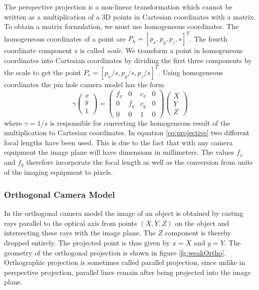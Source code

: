 \documentclass[11pt,a4paper]{report}
\begin{document}
The perspective projection is a non-linear transformation which cannot be written
as a multiplication of a 3D points in Cartesian coordinates with a matrix. To obtain a matrix formulation, we must
use homogeneous coordinates. The homogeneous coordinates of a point are $P_h =
[p_x,p_y,p_z,s]^T$. The fourth coordinate component $s$ is called
\textit{scale}. We transform a point in homogeneous coordinates into Cartesian
coordinates by dividing the first three components by the scale to get the point
$P_c = [p_x/s, p_y/s, p_z/s]^T$. Using homogeneous coordinates the pin hole
camera model has the form
\begin{equation}\label{eq:projective}
\gamma\begin{pmatrix}x\\y\\1\end{pmatrix}
= \begin{pmatrix}f_x&0&c_x&0\\0&f_y&c_y&0\\0&0&1&0\end{pmatrix} \begin{pmatrix}X\\Y\\Z\end{pmatrix}
\end{equation}
where $\gamma = 1/s$ is responsible for converting the homogeneous result of the
multiplication to Cartesian coordinates. In equation \ref{eq:projective} two
different focal lengths have been used. This is due to the fact that with any
camera equipment the image plane will have dimensions in millimeters. The values
$f_x$ and $f_y$ therefore incorporate the focal length as well as the conversion
from units of the imaging equipment to pixels.

\subsubsection{Orthogonal Camera Model}
In the orthogonal camera model the image of an object is obtained by casting
rays parallel to the optical axis from points $(X,Y,Z)$ on the object and intersecting
these rays with the image plane. The $Z$ component is thereby dropped
entirely. The projected point is thus given by $x = X$ and $y = Y$. The geometry
of the orthogonal projection is shown in figure \ref{fg:weakOrtho}. Orthographic
projection is sometimes called parallel projection, since unlike in perspective
projection, parallel lines remain after being projected into the image plane.
\end{document}

